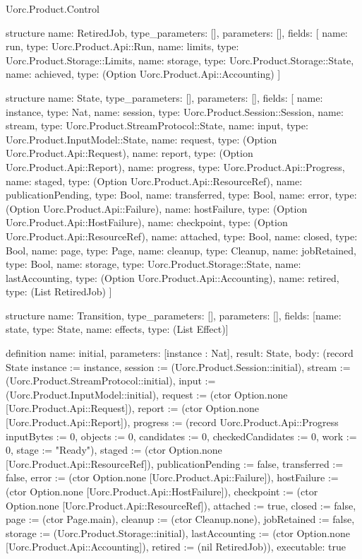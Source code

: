 \begin{lexlean}{Uorc.Product.Control}
\begin{semanticmodule}
structure{
  name: RetiredJob,
  type_parameters: [],
  parameters: [],
  fields: [
    {name: run, type: Uorc.Product.Api::Run},
    {name: limits, type: Uorc.Product.Storage::Limits},
    {name: storage, type: Uorc.Product.Storage::State},
    {name: achieved, type: (Option Uorc.Product.Api::Accounting)}
  ]
}

structure{
  name: State,
  type_parameters: [],
  parameters: [],
  fields: [
    {name: instance, type: Nat},
    {name: session, type: Uorc.Product.Session::Session},
    {name: stream, type: Uorc.Product.StreamProtocol::State},
    {name: input, type: Uorc.Product.InputModel::State},
    {name: request, type: (Option Uorc.Product.Api::Request)},
    {name: report, type: (Option Uorc.Product.Api::Report)},
    {name: progress, type: Uorc.Product.Api::Progress},
    {name: staged, type: (Option Uorc.Product.Api::ResourceRef)},
    {name: publicationPending, type: Bool},
    {name: transferred, type: Bool},
    {name: error, type: (Option Uorc.Product.Api::Failure)},
    {name: hostFailure, type: (Option Uorc.Product.Api::HostFailure)},
    {name: checkpoint, type: (Option Uorc.Product.Api::ResourceRef)},
    {name: attached, type: Bool},
    {name: closed, type: Bool},
    {name: page, type: Page},
    {name: cleanup, type: Cleanup},
    {name: jobRetained, type: Bool},
    {name: storage, type: Uorc.Product.Storage::State},
    {name: lastAccounting, type: (Option Uorc.Product.Api::Accounting)},
    {name: retired, type: (List RetiredJob)}
  ]
}

structure{
  name: Transition,
  type_parameters: [],
  parameters: [],
  fields: [{name: state, type: State}, {name: effects, type: (List Effect)}]
}

definition{
  name: initial,
  parameters: [instance : Nat],
  result: State,
  body: (record State {instance := instance, session := (Uorc.Product.Session::initial), stream := (Uorc.Product.StreamProtocol::initial), input := (Uorc.Product.InputModel::initial), request := (ctor Option.none [Uorc.Product.Api::Request]), report := (ctor Option.none [Uorc.Product.Api::Report]), progress := (record Uorc.Product.Api::Progress {inputBytes := 0, objects := 0, candidates := 0, checkedCandidates := 0, work := 0, stage := "Ready"}), staged := (ctor Option.none [Uorc.Product.Api::ResourceRef]), publicationPending := false, transferred := false, error := (ctor Option.none [Uorc.Product.Api::Failure]), hostFailure := (ctor Option.none [Uorc.Product.Api::HostFailure]), checkpoint := (ctor Option.none [Uorc.Product.Api::ResourceRef]), attached := true, closed := false, page := (ctor Page.main), cleanup := (ctor Cleanup.none), jobRetained := false, storage := (Uorc.Product.Storage::initial), lastAccounting := (ctor Option.none [Uorc.Product.Api::Accounting]), retired := (nil RetiredJob)}),
  executable: true
}


\end{semanticmodule}
\end{lexlean}

